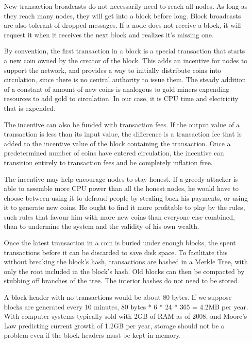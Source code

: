 \documentclass{article}
\begin{document}
New transaction broadcasts do not necessarily need to reach all nodes. As long as they reach many nodes, they will get into a block before long. Block broadcasts are also tolerant of dropped messages. If a node does not receive a block, it will request it when it receives the next block and realizes it's missing one.

By convention, the first transaction in a block is a special transaction that starts a new coin owned by the creator of the block. This adds an incentive for nodes to support the network, and provides a way to initially distribute coins into circulation, since there is no central authority to issue them. The steady addition of a constant of amount of new coins is analogous to gold miners expending resources to add gold to circulation. In our case, it is CPU time and electricity that is expended.

The incentive can also be funded with transaction fees. If the output value of a transaction is less than its input value, the difference is a transaction fee that is added to the incentive value of the block containing the transaction. Once a predetermined number of coins have entered circulation, the incentive can transition entirely to transaction fees and be completely inflation free.

The incentive may help encourage nodes to stay honest. If a greedy attacker is able to assemble more CPU power than all the honest nodes, he would have to choose between using it to defraud people by stealing back his payments, or using it to generate new coins. He ought to find it more profitable to play by the rules, such rules that favour him with more new coins than everyone else combined, than to undermine the system and the validity of his own wealth.

Once the latest transaction in a coin is buried under enough blocks, the spent transactions before it can be discarded to save disk space. To facilitate this without breaking the block's hash, transactions are hashed in a Merkle Tree, with only the root included in the block's hash. Old blocks can then be compacted by stubbing off branches of the tree. The interior hashes do not need to be stored.

A block header with no transactions would be about 80 bytes. If we suppose blocks are generated every 10 minutes, 80 bytes * 6 * 24 * 365 = 4.2MB per year. With computer systems typically sold with 2GB of RAM as of 2008, and Moore's Law predicting current growth of 1.2GB per year, storage should not be a problem even if the block headers must be kept in memory.
\end{document}
